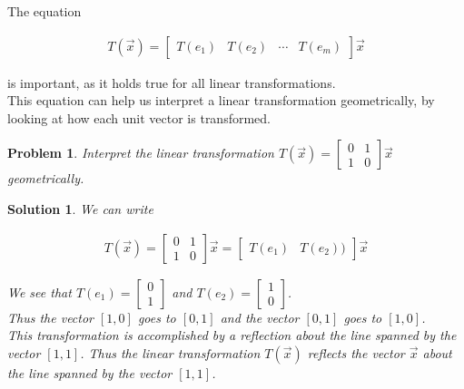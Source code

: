 \documentclass{article}
\newtheorem{problem}{Problem}
\newtheorem*{solution}{Solution}
\begin{document}
The equation 

\begin{align*}
T(\vec{x}) = \begin{bmatrix} T(e_{1}) & T(e_{2}) & \cdots & T(e_{m}) \end{bmatrix} \vec{x}
\end{align*}

is important, as it holds true for all linear transformations. \\

This equation can help us interpret a linear transformation geometrically, by looking at how each unit vector is transformed.

\begin{problem}
Interpret the linear transformation $T(\vec{x}) = \begin{bmatrix} 0 & 1 \\ 1 & 0 \end{bmatrix} \vec{x}$ geometrically.
\end{problem}

\begin{solution}
We can write

\begin{align*}
T(\vec{x}) = \begin{bmatrix} 0 & 1 \\ 1 & 0 \end{bmatrix} \vec{x} = \begin{bmatrix} T(e_{1}) & T(e_{2})) \end{bmatrix} \vec{x}
\end{align*}

We see that $T(e_{1}) = \begin{bmatrix}0 \\ 1 \end{bmatrix}$ and $T(e_{2}) = \begin{bmatrix}1 \\ 0 \end{bmatrix}$. \\

Thus the vector $[1, 0]$ goes to $[0, 1]$ and the vector $[0, 1]$ goes to $[1, 0]$. \\

This transformation is accomplished by a reflection about the line spanned by the vector $[1, 1]$. Thus the linear transformation $T(\vec{x})$ reflects the vector $\vec{x}$ about the line spanned by the vector $[1, 1]$.
\end{solution}
\end{document}
